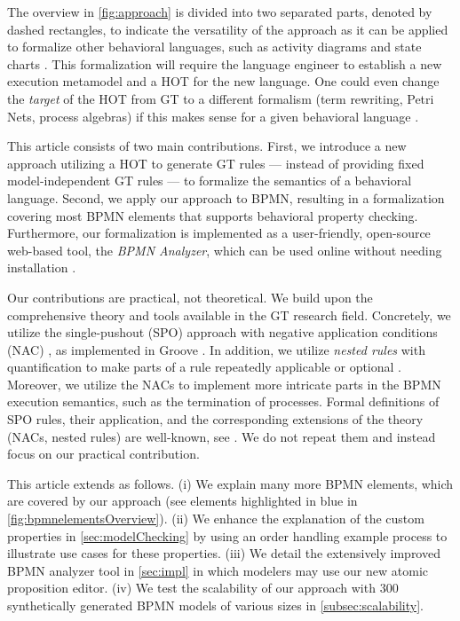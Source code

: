 \documentclass{lmcs} %
\begin{document}
The overview in \autoref{fig:approach} is divided into two separated parts, denoted by dashed rectangles, to indicate the versatility of the approach as it can be applied to formalize other behavioral languages, such as activity diagrams and state charts \cite{seidlUMLClassroom2015, objectmanagementgroupUnifiedModelingLanguage2017}.
This formalization will require the language engineer to establish a new execution metamodel and a HOT for the new language.
One could even change the \textit{target} of the HOT from GT to a different formalism (term rewriting, Petri Nets, process algebras) if this makes sense for a given behavioral language \cite{krauterBehavioralConsistencyMultimodeling2023}.

This article consists of two main contributions.
First, we introduce a new approach utilizing a HOT to generate GT rules --- instead of providing fixed model-independent GT rules --- to formalize the semantics of a behavioral language.
Second, we apply our approach to BPMN, resulting in a formalization covering most BPMN elements that supports behavioral property checking.
Furthermore, our formalization is implemented as a user-friendly, open-source web-based tool, the \textit{BPMN Analyzer}, which can be used online without needing installation \cite{timkrauterLMCS2024Artifacts2023}.

Our contributions are practical, not theoretical.
We build upon the comprehensive theory and tools available in the GT research field.
Concretely, we utilize the single-pushout (SPO) approach with negative application conditions (NAC) \cite{ehrigALGEBRAICAPPROACHESGRAPH1997}, as implemented in Groove \cite{rensinkGROOVESimulatorTool2004}.
In addition, we utilize \textit{nested rules} with quantification to make parts of a rule repeatedly applicable or optional \cite{rensinkNestedQuantificationGraph2006,rensinkHowMuchAre2017}.
Moreover, we utilize the NACs to implement more intricate parts in the BPMN execution semantics, such as the termination of processes.
Formal definitions of SPO rules, their application, and the corresponding extensions of the theory (NACs, nested rules) are well-known, see \cite{ehrigALGEBRAICAPPROACHESGRAPH1997,rensinkNestedQuantificationGraph2006}.
We do not repeat them and instead focus on our practical contribution.

This article extends \cite{krauterFormalizationAnalysisBPMN2023} as follows.
(i) We explain many more BPMN elements, which are covered by our approach (see elements highlighted in blue in \autoref{fig:bpmnelementsOverview}).
(ii) We enhance the explanation of the custom properties in \autoref{sec:modelChecking} by using an order handling example process to illustrate use cases for these properties.
(iii) We detail the extensively improved BPMN analyzer tool in \autoref{sec:impl} in which modelers may use our new atomic proposition editor.
(iv) We test the scalability of our approach with 300 synthetically generated BPMN models of various sizes in \autoref{subsec:scalability}. 
\end{document}

